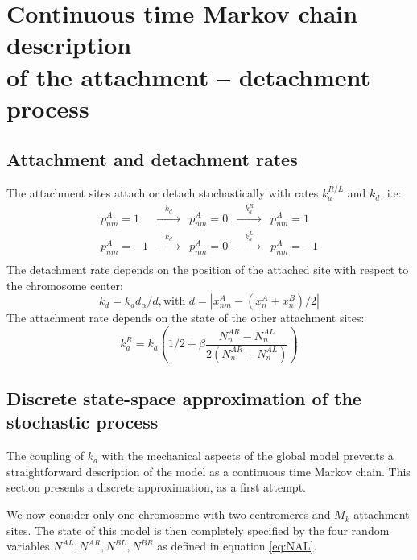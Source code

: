 \documentclass[a4paper,12pt]{article}
\begin{document}
\section{Continuous time Markov chain description\\
 of the attachment -- detachment process}
\label{sec:markov}


\subsection{Attachment and detachment rates}

The attachment sites attach or detach stochastically with rates $k_a^{R/L}$
and $k_d$, i.e:
\begin{equation}
  \begin{aligned}
    p_{nm}^A = 1 &\xrightarrow{\quad k_d \quad}& p_{nm}^A = 0%
    &\xrightarrow{\quad k_a^R \quad}& p_{nm}^A = 1\\
    p_{nm}^A= -1 &\xrightarrow{\quad k_d \quad}& p_{nm}^A = 0%
    &\xrightarrow{\quad k_a^L \quad}& p_{nm}^A = -1\\
  \end{aligned}
\end{equation}
The detachment rate depends on the position of the attached site with
respect to the chromosome center:
\begin{equation}
  \label{eq:k_d}
  k_d = k_ad_\alpha / d, \mbox{with } d = \left| x^A_{nm} - %
  \left(x^A_{n}+ x^B_{n}\right) / 2 \right|
\end{equation}
The attachment rate depends on the state of the other attachment
sites:
\begin{equation}
  \label{eq:k_a}
  k_a^R = k_a\left( 1/2 + \beta\frac{N_n^{AR} - N_n^{AL}}%
    {2\left(N_n^{AR} + N_n^{AL}\right)}\right)
\end{equation}
  
\subsection{Discrete state-space approximation of the stochastic
  process}
\label{sec:Defintions}

The coupling of $k_d$ with the mechanical aspects of the global model
prevents a straightforward description of the model as a continuous
time Markov chain. This section presents a discrete approximation, as
a first attempt.

We now consider only one chromosome with two centromeres and $M_k$
attachment sites. The state of this model is then completely specified
by the four random variables $N^{AL}, N^{AR}, N^{BL}, N^{BR}$ as
defined in equation \ref{eq:NAL}. 
\end{document}
